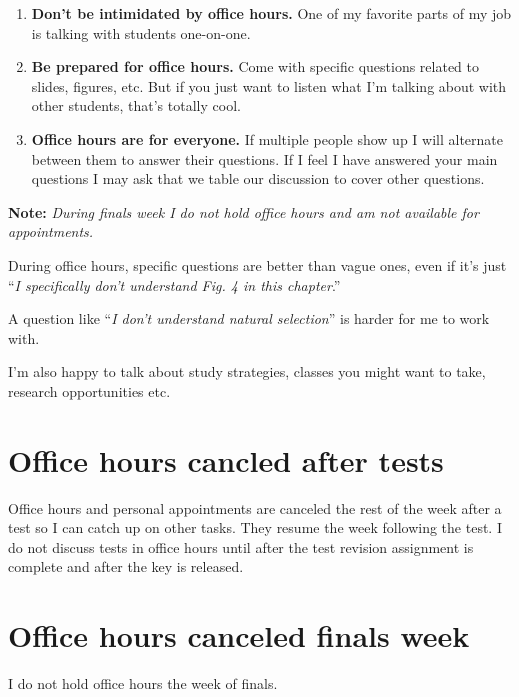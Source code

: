 \documentclass[
]{book}
\providecommand{\tightlist}{%
  \setlength{\itemsep}{0pt}\setlength{\parskip}{0pt}}
\begin{document}
\begin{enumerate}
\def\labelenumi{\arabic{enumi}.}
\tightlist
\item
  \textbf{Don't be intimidated by office hours.} One of my favorite parts of my job is talking with students one-on-one.
\item
  \textbf{Be prepared for office hours.} Come with specific questions related to slides, figures, etc. But if you just want to listen what I'm talking about with other students, that's totally cool.
\item
  \textbf{Office hours are for everyone.} If multiple people show up I will alternate between them to answer their questions. If I feel I have answered your main questions I may ask that we table our discussion to cover other questions.
\end{enumerate}

\textbf{Note:} \emph{During finals week I do not hold office hours and am not available for appointments.}

During office hours, specific questions are better than vague ones, even if it's just ``\emph{I specifically don't understand Fig. 4 in this chapter}.''

A question like ``\emph{I don't understand natural selection}'' is harder for me to work with.

I'm also happy to talk about study strategies, classes you might want to take, research opportunities etc.

\hypertarget{office-hours-cancled-after-tests}{%
\chapter{Office hours cancled after tests}\label{office-hours-cancled-after-tests}}

Office hours and personal appointments are canceled the rest of the week after a test so I can catch up on other tasks. They resume the week following the test. I do not discuss tests in office hours until after the test revision assignment is complete and after the key is released.

\hypertarget{office-hours-canceled-finals-week}{%
\chapter{Office hours canceled finals week}\label{office-hours-canceled-finals-week}}

I do not hold office hours the week of finals.
\end{document}
